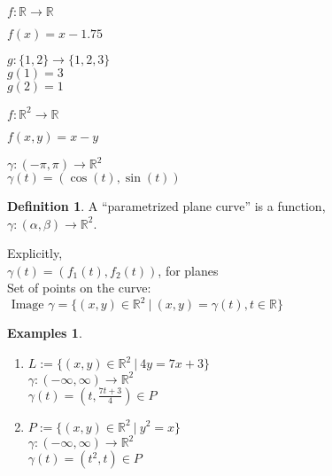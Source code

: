 \documentclass[twocolumn,20pt,fleqn]{extarticle}
\newcommand{\sep}{\vspace{0.5cm}}
\theoremstyle{plain}
\theoremstyle{definition}
\newtheorem*{definition}{Definition}
\newtheorem*{exmpls}{Examples}
\theoremstyle{remark}
\newenvironment*{examples}{\begin{exmpls} ~ \begin{enumerate}}{\end{enumerate}\end{exmpls}}
\begin{document}
$ f: \mathbb{R}  \to \mathbb{R}$

$f(x) = x - 1.75$\\

\sep

  $g : \{1,2\} \to \{1,2,3\}$\\
    $g(1) = 3$\\
    $g(2) = 1$\\

\sep

$ f: \mathbb{R}^2  \to \mathbb{R}$

$f(  x,y  ) = x - y$


\sep

$\gamma :  (-\pi,\pi)  \to \mathbb{R}^2$\\
$\gamma(t) = (\cos(t), \sin(t))$



\newpage



\begin{definition}
  A  ``parametrized plane curve''  is a  function,\\ $\gamma  : (\alpha, \beta) \to \mathbb{R}^2$.
\end{definition}

Explicitly,\\
$\gamma(t) = (f_1(t), f_2(t))$, for planes\\

Set of points on the curve:\\  $\textrm{ Image } \gamma = \{(x,y) \in \mathbb{R}^2 \ |\ (x,y) = \gamma(t), t \in \mathbb{R}\}$




\begin{examples}
  \item $L:=\{(x,y) \in \mathbb{R}^2\ |\ 4y = 7x + 3\}$\\
  $\gamma  : (-\infty,\infty) \to \mathbb{R}^2$ \\
  $\gamma(t) = (t, \frac{7t+3}{4})  \in P$\\
  \item $P:=\{(x,y) \in \mathbb{R}^2\ |\ y^2 = x\}$\\
  $\gamma  : (-\infty,\infty) \to \mathbb{R}^2$ \\
  $\gamma(t) = (t^2, t)  \in P$\\
\end{examples}
\end{document}
